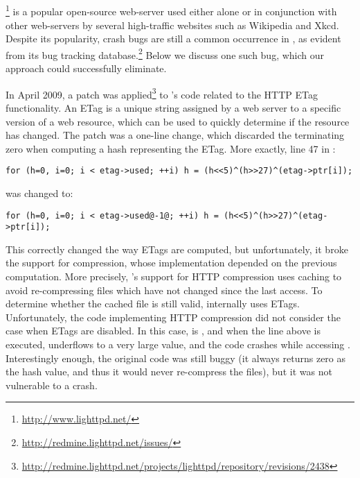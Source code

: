 \subsection{\lighttpd}

\lighttpd\footnote{\url{http://www.lighttpd.net/}} is a popular open-source 
web-server used either alone or in conjunction with other web-servers
by several high-traffic websites such as Wikipedia and Xkcd.
Despite its popularity, crash bugs are still a common
occurrence in \lighttpd, as evident from its bug tracking
database.\footnote{\url{http://redmine.lighttpd.net/issues/}}  Below
we discuss one such bug, which our approach could successfully
eliminate.

In April 2009, a patch was
applied\footnote{\url{http://redmine.lighttpd.net/projects/lighttpd/repository/revisions/2438}}
to \lighttpd's code related to the HTTP ETag functionality.  An ETag
is a unique string assigned by a web server to a specific version of a
web resource, which can be used to quickly determine if the resource
has changed.  The patch was a one-line change, which discarded the
terminating zero when computing a hash representing the ETag.  More
exactly, line 47 in :

\begin{lstlisting}[numbers=none,breaklines=true,xleftmargin=0pt]
for (h=0, i=0; i < etag->used; ++i) h = (h<<5)^(h>>27)^(etag->ptr[i]);
\end{lstlisting}
\noindent was changed to:
\begin{lstlisting}[numbers=none,breaklines=true,xleftmargin=0pt]
for (h=0, i=0; i < etag->used@-1@; ++i) h = (h<<5)^(h>>27)^(etag->ptr[i]);
\end{lstlisting}

This correctly changed the way ETags are computed, but unfortunately,
it broke the support for compression, whose implementation depended on
the previous computation.  More precisely, \lighttpd's support for HTTP
compression uses caching to avoid re-compressing files which have not
changed since the last access.  To determine whether the cached
file is still valid, \lighttpd internally uses ETags.  Unfortunately,
the code implementing HTTP compression did not consider the case when
ETags are disabled.  In this case, 
is , and when the line above is
executed,  underflows to a very large value, and
the code crashes while accessing .
Interestingly enough, the original code was still buggy (it always
returns zero as the hash value, and thus it would never re-compress
the files), but it was not vulnerable to a crash.

